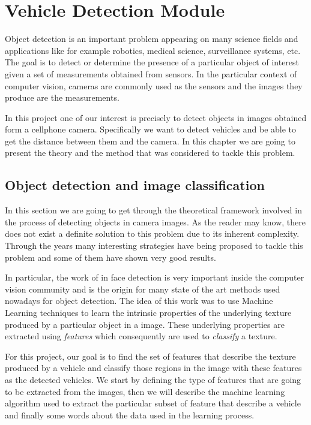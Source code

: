 \chapter{Vehicle Detection Module}  \label{kap:vehicle-detection}

Object detection is an important problem appearing on many science fields and
applications like for example robotics, medical science, surveillance systems, etc. The
goal is to detect or determine the presence of a particular object of interest
given a set of measurements obtained from sensors. In the particular context of
computer vision, cameras are commonly used as the sensors and the images they
produce are the measurements.

In this project one of our interest is precisely to detect objects in images 
obtained form a cellphone camera. Specifically we want to detect vehicles and 
be able to get the distance between them and the camera. In this
chapter we are going to present the theory and the method that was considered to
tackle this problem.

\section{Object detection and image classification} %
\label{sec:Object-detection-and-image-classification}

In this section we are going to get through the theoretical framework involved
in the process of detecting objects in camera images. As the reader may know,
there does not exist a definite solution to this problem due to its inherent
complexity. Through the years many interesting strategies have being proposed to
tackle this problem and some of them have shown very good results.

In particular, the work of \cite{viola-jones} in face detection is very
important inside the computer vision community and is the origin for many state
of the art methods used nowadays for object detection. The idea of this work was
to use Machine Learning techniques to learn the intrinsic properties of the
underlying texture produced by a particular object in a image. These underlying
properties are extracted using \textit{features} which consequently are
used to \textit{classify} a texture.

For this project, our goal is to find the set of features that describe the
texture produced by a vehicle and classify those regions in the image with these
features as the detected vehicles. We start by defining the type of features
that are going to be extracted from the images, then we will describe the
machine learning algorithm used to extract the particular subset of feature that
describe a vehicle and finally some words about the data used in the learning
process.

